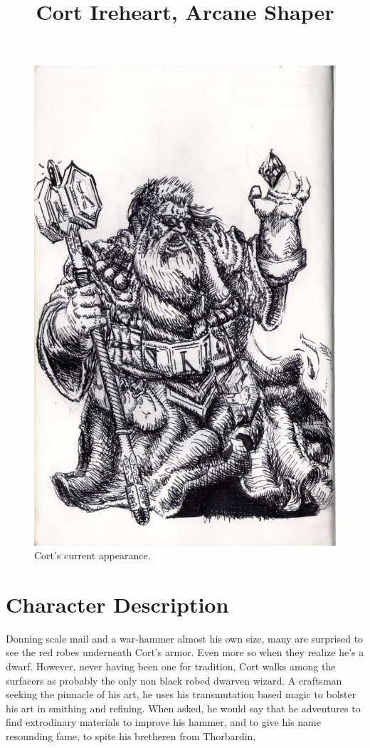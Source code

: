 \documentclass[12pt]{article}
\begin{document}
 
\title{Cort Ireheart, Arcane Shaper}
\date{}

\maketitle


\begin{figure}[H]
  \centering
  \includegraphics[width=.62\textwidth]{./resources/Cort_Ireheart.jpg}
  \caption{Cort's current appearance.}
\end{figure}

\section{Character Description}

Donning scale mail and a war-hammer almost his own size, many are surprised to
see the red robes underneath Cort's armor. Even more so when they realize he's
a dwarf. However, never having been one for tradition, Cort walks among the
surfacers as probably the only non black robed dwarven wizard. A craftsman
seeking the pinnacle of his art, he uses his transmutation based magic to
bolster his art in smithing and refining. When asked, he would say that he
adventures to find extrodinary materials to improve his hammer, and to give his
name resounding fame, to spite his bretheren from Thorbardin.
\end{document}
